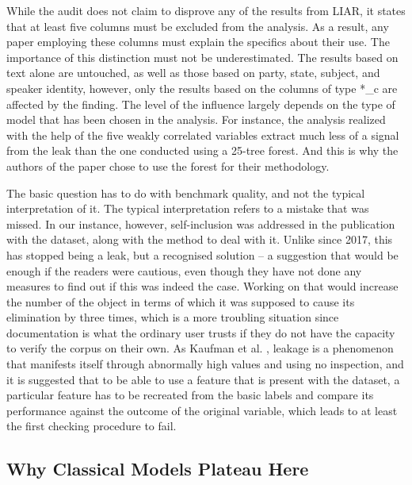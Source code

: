 While the audit does not claim to disprove any of the results from LIAR, it states that at least five columns must be excluded from the analysis. As a result, any paper employing these columns must explain the specifics about their use. The importance of this distinction must not be underestimated. The results based on text alone are untouched, as well as those based on party, state, subject, and speaker identity, however, only the results based on the columns of type *\_c are affected by the finding. The level of the influence largely depends on the type of model that has been chosen in the analysis. For instance, the analysis realized with the help of the five weakly correlated variables extract much less of a signal from the leak than the one conducted using a 25-tree forest. And this is why the authors of the paper chose to use the forest for their methodology.

The basic question has to do with benchmark quality, and not the typical interpretation of it. The typical interpretation refers to a mistake that was missed. In our instance, however, self-inclusion was addressed in the publication with the dataset, along with the method to deal with it. Unlike since 2017, this has stopped being a leak, but a recognised solution -- a suggestion that would be enough if the readers were cautious, even though they have not done any measures to find out if this was indeed the case. Working on that would increase the number of the object in terms of which it was supposed to cause its elimination by three times, which is a more troubling situation since documentation is what the ordinary user trusts if they do not have the capacity to verify the corpus on their own. As Kaufman et al. \cite{kaufman2012leakage}, leakage is a phenomenon that manifests itself through abnormally high values and using no inspection, and it is suggested that to be able to use a feature that is present with the dataset, a particular feature has to be recreated from the basic labels and compare its performance against the outcome of the original variable, which leads to at least the first checking procedure to fail.

\subsection{Why Classical Models Plateau Here}

